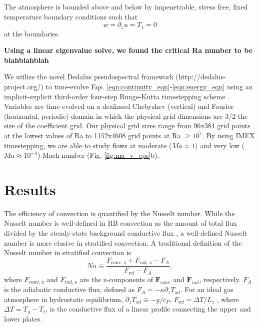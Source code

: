 \documentclass[aps, prl, twocolumn, groupedaddress, amsfonts, amssymb, amsmath]{revtex4-1}
\begin{document}
The atmosphere is bounded above
and below by impenetrable, stress free, fixed temperature boundary conditions such that
\begin{equation}
w = \partial_z u = T_1 = 0
\end{equation}
at the boundaries. 

\textbf{Using a linear eigenvalue solve, we found the critical Ra number to be blahblahblah}


We utilize the novel Dedalus pseudospectral framework (http://dedalus-project.org/) to time-evolve Eqs. 
\ref{eqn:continuity_eqn}-\ref{eqn:energy_eqn} using an implicit-explicit third-order four-step 
Runge-Kutta timestepping scheme \cite{ascher&all1997}.  
Variables are time-evolved on a dealiased Chebyshev (vertical)
and Fourier (horizontal, periodic) domain in which the
physical grid dimensions are 3/2 the size of the coefficient grid.  Our physical grid sizes range from
96x384 grid points at the lowest values of Ra to 1152x4608 grid points at Ra $\geq 10^{7}$. 
By using IMEX timestepping, we are able to study flows at moderate ($Ma \approx 1$) and very low ($Ma \approx 10^{-4}$)
Mach number (Fig. \ref{fig:ma_v_eps}b).

\section{Results}
\label{sec:results}

The efficiency of convection is quantified by the Nusselt number.  
While the Nusselt number is well-defined in RB convection
as the amount of total flux divided by the steady-state background conductive flux 
\cite{johnston&doering2009, otero&all2002},
a well-defined Nusselt number is more elusive in stratified convection.  A traditional definition of the Nusselt
number in stratified convection is \cite{graham1975,hurlburt&all1984}
\begin{equation}
Nu \equiv \frac{F_{\text{conv, z}} + F_{\text{rad, z}} - F_A}{F_{\text{ref}} - F_A},
\label{eqn:nusselt}
\end{equation}
where $F_{\text{conv, z}}$ and $F_{\text{rad, z}}$ are the z-components of $\bm{F}_{\text{conv}}$ and $\bm{F}_{\text{rad}}$,
respectively.  $F_A$ is the adiabatic conductive flux, defined as $F_A = -\kappa \partial_z T_{\text{ad}}$.  For an
ideal gas atmosphere in hydrostatic equilibrium, $\partial_z T_{\text{ad}} \equiv - g / c_{P}$.
$F_{\text{ref}} = \Delta T / L_z$ , where $\Delta T = T_{u} - T_{\ell}$, is the conductive flux of a linear profile connecting the upper
and lower plates.
\end{document}
